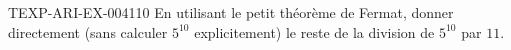 \begin{exercice}{TEXP-ARI-EX-004}{1}{10}
En utilisant le petit théorème de Fermat, donner directement (sans calculer $5^{10}$ explicitement) le reste de la division de $5^{10}$ par $11$.
\end{exercice}

